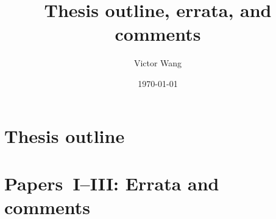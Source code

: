 \documentclass{article}
\title{Thesis outline, errata, and comments}
\author{Victor Wang}
\date{\today}
\begin{document}
\maketitle

\section{Thesis outline}

\section{Papers~I--III: Errata and comments}
\end{document}
